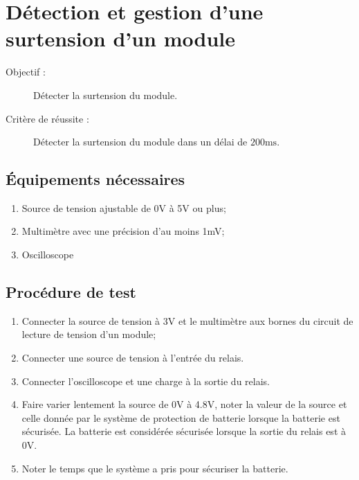 
\section{Détection et gestion d'une surtension d'un module}

\begin{description}
	\item[Objectif :] Détecter la surtension du module.
	\item[Critère de réussite :] Détecter la surtension du module dans un délai de $200\text{ms}$.
\end{description}

\subsection*{Équipements nécessaires}
\begin{enumerate}
	\item Source de tension ajustable de 0V à 5V ou plus;
	\item Multimètre avec une précision d'au moins 1mV;
	\item Oscilloscope
\end{enumerate}	

\subsection*{Procédure de test}
\begin{enumerate}
	\item Connecter la source de tension à 3V et le multimètre aux bornes du circuit de lecture de tension d'un module;
	\item Connecter une source de tension à l'entrée du relais.
	\item Connecter l'oscilloscope et une charge à la sortie du relais.
	\item Faire varier lentement la source de 0V à 4.8V, noter la valeur de la source et celle donnée par le système de protection de batterie lorsque la batterie est sécurisée. La batterie est considérée sécurisée lorsque la sortie du relais est à 0V. 
	\item Noter le temps que le système a pris pour sécuriser la batterie.
\end{enumerate}